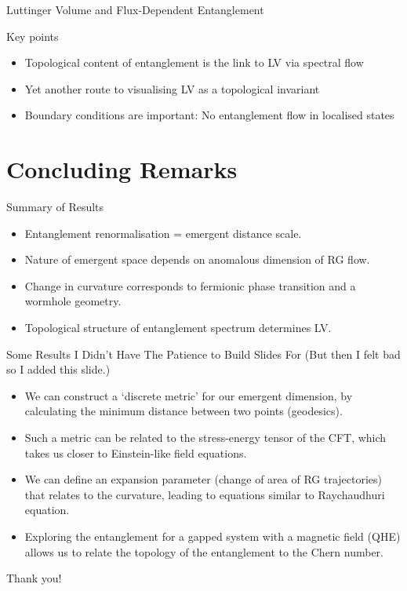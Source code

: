 \documentclass[12pt,aspectratio=169]{beamer}
\begin{document}
\begin{frame}{Luttinger Volume and Flux-Dependent Entanglement}
{	\flushleft
	\alert{Key points}
	\begin{itemize}
		\item Topological content of entanglement is the link to LV via spectral flow
		\item Yet another route to visualising LV as a topological invariant
		\item \alert{Boundary conditions} are important: No entanglement flow in localised states
	\end{itemize}
}
\end{frame}

\section{Concluding Remarks}
\begin{frame}{Summary of Results}
	\begin{itemize}
		\item Entanglement renormalisation = emergent distance scale. \\[10pt]
		\item Nature of emergent space depends on anomalous dimension of RG flow.\\[10pt]
		\item Change in curvature corresponds to fermionic phase transition and a wormhole geometry.\\[10pt]
		\item Topological structure of entanglement spectrum determines LV.\\[10pt]
	\end{itemize}
\end{frame}

\begin{frame}{Some Results I Didn't Have The Patience to Build Slides For}
	(\alert{But then I felt bad so I added this slide.})

	\begin{itemize}
		\item We can construct a `discrete metric' for our emergent dimension, by calculating the minimum distance between two points (geodesics).
		\item Such a metric can be related to the stress-energy tensor of the CFT, which takes us closer to Einstein-like field equations.
		\item We can define an expansion parameter (change of area of RG trajectories) that relates to the curvature, leading to equations similar to Raychaudhuri equation.
		\item Exploring the entanglement for a gapped system with a magnetic field (QHE) allows us to relate the topology of the entanglement to the Chern number.
	\end{itemize}

\end{frame}

\begin{frame}{}
	\LARGE Thank you!
\end{frame}
\printbibliography
\end{document}
